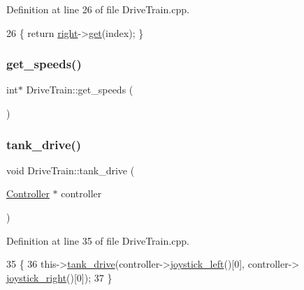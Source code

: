 Definition at line 26 of file Drive\+Train.\+cpp.


\begin{DoxyCode}
26 \{ \textcolor{keywordflow}{return} \hyperlink{class_drive_train_a1fe3a54242798b1b88eb437c7c7cf9ad}{right}->\hyperlink{class_motor_group_a5bb7e87231ada3770df40783a2c6afda}{get}(index); \}
\end{DoxyCode}
\mbox{\label{class_drive_train_a50bf393e1ecd61225c78b43e6ffd5fc3}} 
\subsubsection{\texorpdfstring{get\+\_\+speeds()}{get\_speeds()}}
{\footnotesize\ttfamily int$\ast$ Drive\+Train\+::get\+\_\+speeds (\begin{DoxyParamCaption}{ }\end{DoxyParamCaption})}

\mbox{\label{class_drive_train_aaaa020990153f43209fe1114296cc9d5}} 
\subsubsection{\texorpdfstring{tank\+\_\+drive()}{tank\_drive()}\hspace{0.1cm}{\footnotesize\ttfamily [1/4]}}
{\footnotesize\ttfamily void Drive\+Train\+::tank\+\_\+drive (\begin{DoxyParamCaption}\item[{\hyperlink{class_controller}{Controller} $\ast$}]{controller }\end{DoxyParamCaption})}



Definition at line 35 of file Drive\+Train.\+cpp.


\begin{DoxyCode}
35                                                   \{
36     this->\hyperlink{class_drive_train_aaaa020990153f43209fe1114296cc9d5}{tank\_drive}(controller->\hyperlink{class_controller_a2d21a10299aaacdcdb571b10f6436270}{joystick\_left}()[0], controller->
      \hyperlink{class_controller_a1f02ff9e9853dd53232df37f6676b0dc}{joystick\_right}()[0]);
37 \}
\end{DoxyCode}
\mbox{\label{class_drive_train_a21236fdee1a5a90a41b81ced6548aeb9}} 
